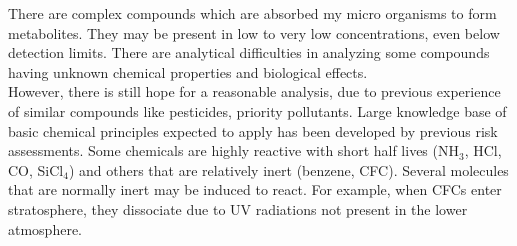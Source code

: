 \documentclass[pdftex,12pt,a4paper]{article}
\begin{document}
There are complex compounds which are absorbed my micro organisms to form metabolites. They may be present in low to very low concentrations, even below detection limits. There are analytical difficulties in analyzing some compounds having unknown chemical properties and biological effects.\\

However, there is still hope for a reasonable analysis, due to previous experience of similar compounds like pesticides, priority pollutants. Large knowledge base of basic chemical principles expected to apply has been developed by previous risk assessments. Some chemicals are highly reactive with short half lives (NH$_3$, HCl, CO, SiCl$_4$) and others that are relatively inert (benzene, CFC). Several molecules that are normally inert may be induced to react. For example, when CFCs enter stratosphere, they dissociate due to UV radiations not present in the lower atmosphere.
\end{document}
